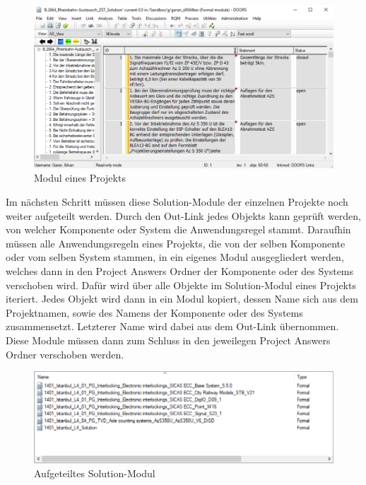 \begin{figure}[H]
    \centering
    \includegraphics[width = \textwidth]{abbildungen/Solutions.PNG}
    \caption{Modul eines Projekts}
    \label{fig:SolutionsModul}
\end{figure}

Im nächsten Schritt müssen diese Solution-Module der einzelnen Projekte noch weiter aufgeteilt werden. Durch den Out-Link jedes Objekts kann geprüft werden, von welcher Komponente oder System die
Anwendungsregel stammt. Daraufhin müssen alle Anwendungsregeln eines Projekts, die von der selben Komponente oder vom selben System stammen, in ein eigenes Modul ausgegliedert werden, welches dann
in den Project Answers Ordner der Komponente oder des Systems verschoben wird. Dafür wird über alle Objekte im Solution-Modul eines Projekts iteriert. Jedes Objekt wird dann 
in ein Modul kopiert, dessen Name sich aus dem Projektnamen, sowie des Namens der Komponente oder des Systems zusammensetzt. Letzterer Name wird dabei aus dem Out-Link übernommen. Diese Module müssen dann 
zum Schluss in den jeweilegen Project Answers Ordner verschoben werden.

\begin{figure}[H]
    \centering
    \includegraphics[width = \textwidth]{abbildungen/Aufgeteilte Module.PNG}
    \caption{Aufgeteiltes Solution-Modul}
    \label{fig:AufgeteilteModule}
\end{figure}

